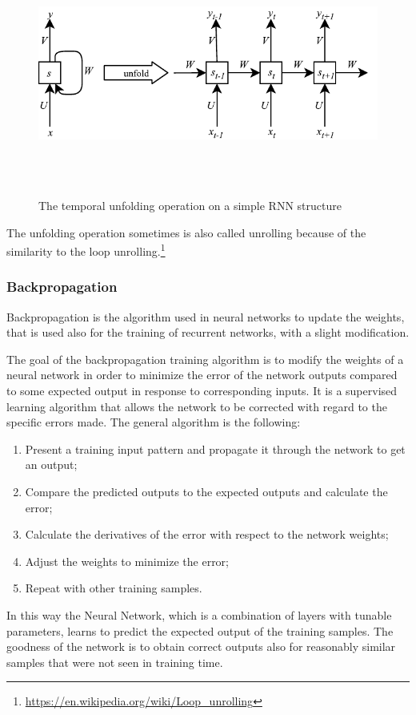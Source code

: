 \begin{figure}[!htb]
    \centering
    \includegraphics[max width=0.9\linewidth,max height=8cm,keepaspectratio]{figures/rnnUnfold}
    \caption{The temporal unfolding operation on a simple RNN structure}\label{fig:rnnUnfold}
\end{figure}

The unfolding operation sometimes is also called unrolling because of the similarity to the loop unrolling.\footnote{\url{https://en.wikipedia.org/wiki/Loop\_unrolling}}

\subsubsection{Backpropagation}
Backpropagation is the algorithm used in neural networks to update the weights, that is used also for the training of recurrent networks, with a slight modification.

The goal of the backpropagation training algorithm is to modify the weights of a neural network in order to minimize the error of the network outputs compared to some expected output in response to corresponding inputs. It is a supervised learning algorithm that allows the network to be corrected with regard to the specific errors made.
The general algorithm is the following:

\begin{enumerate}
	\item Present a training input pattern and propagate it through the network to get an output;
	\item Compare the predicted outputs to the expected outputs and calculate the error;
	\item Calculate the derivatives of the error with respect to the network weights;
	\item Adjust the weights to minimize the error;
	\item Repeat with other training samples.
\end{enumerate}
In this way the Neural Network, which is a combination of layers with tunable parameters, learns to predict the expected output of the training samples. The goodness of the network is to obtain correct outputs also for reasonably similar samples that were not seen in training time.

